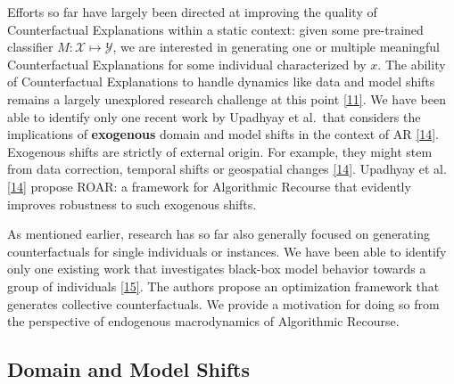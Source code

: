 \documentclass[conference,final,]{IEEEtran}
\theoremstyle{definition}
\theoremstyle{definition}
\theoremstyle{definition}
\theoremstyle{definition}
\theoremstyle{remark}
\begin{document}
Efforts so far have largely been directed at improving the quality of Counterfactual Explanations within a static context: given some pre-trained classifier \(M: \mathcal{X} \mapsto \mathcal{Y}\), we are interested in generating one or multiple meaningful Counterfactual Explanations for some individual characterized by \(x\). The ability of Counterfactual Explanations to handle dynamics like data and model shifts remains a largely unexplored research challenge at this point \protect\hyperlink{ref-verma2020counterfactual}{{[}11{]}}. We have been able to identify only one recent work by Upadhyay et al.~that considers the implications of \textbf{exogenous} domain and model shifts in the context of AR \protect\hyperlink{ref-upadhyay2021robust}{{[}14{]}}. Exogenous shifts are strictly of external origin. For example, they might stem from data correction, temporal shifts or geospatial changes \protect\hyperlink{ref-upadhyay2021robust}{{[}14{]}}. Upadhyay et al. \protect\hyperlink{ref-upadhyay2021robust}{{[}14{]}} propose ROAR: a framework for Algorithmic Recourse that evidently improves robustness to such exogenous shifts.

As mentioned earlier, research has so far also generally focused on generating counterfactuals for single individuals or instances. We have been able to identify only one existing work that investigates black-box model behavior towards a group of individuals \protect\hyperlink{ref-carrizosa2021generating}{{[}15{]}}. The authors propose an optimization framework that generates collective counterfactuals. We provide a motivation for doing so from the perspective of endogenous macrodynamics of Algorithmic Recourse.

\hypertarget{related-shifts}{%
\subsection{Domain and Model Shifts}\label{related-shifts}}
\end{document}

